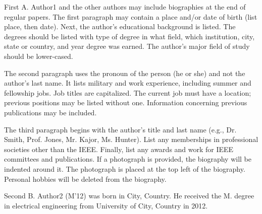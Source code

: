 \documentclass[journal]{IEEEtranTIE}
\begin{document}
{\color{red}

\vspace{-1cm}
\begin{IEEEbiography}
{First A. Author1} and the other authors may include biographies at the end of regular papers. The first paragraph may contain a place and/or date of birth (list place, then date). Next, the author's educational background is listed. The degrees should be listed with type of degree in what field, which institution, city, state or country, and year degree was earned. The author's major field of study should be lower-cased.

The second paragraph uses the pronoun of the person (he or she) and not the author's last name. It lists military and work experience, including summer and fellowship jobs. Job titles are capitalized. The current job must have a location; previous positions may be listed without one. Information concerning previous publications may be included.

The third paragraph begins with the author's title and last name (e.g., Dr. Smith, Prof. Jones, Mr. Kajor, Ms. Hunter). List any memberships in professional societies other than the IEEE. Finally, list any awards and work for IEEE committees and publications. If a photograph is provided, the biography will be indented around it. The photograph is placed at the top left of the biography. Personal hobbies will be deleted from the biography.
\end{IEEEbiography}

\vspace{-2cm}
\begin{IEEEbiography}
{Second B. Author2} (M'12) was born in City, Country. He received the M. degree in electrical engineering from University of City, Country in 2012.


\end{IEEEbiography}}
\end{document}
